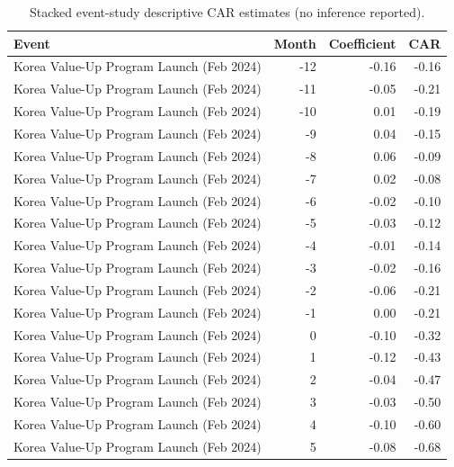 \begin{table}
\caption{Stacked event-study descriptive CAR estimates (no inference reported).}
\label{tab:event_study_coefs}
\begin{tabular}{lrrr}
\toprule
Event & Month & Coefficient & CAR \\
\midrule
Korea Value-Up Program Launch (Feb 2024) & -12 & -0.16 & -0.16 \\
Korea Value-Up Program Launch (Feb 2024) & -11 & -0.05 & -0.21 \\
Korea Value-Up Program Launch (Feb 2024) & -10 & 0.01 & -0.19 \\
Korea Value-Up Program Launch (Feb 2024) & -9 & 0.04 & -0.15 \\
Korea Value-Up Program Launch (Feb 2024) & -8 & 0.06 & -0.09 \\
Korea Value-Up Program Launch (Feb 2024) & -7 & 0.02 & -0.08 \\
Korea Value-Up Program Launch (Feb 2024) & -6 & -0.02 & -0.10 \\
Korea Value-Up Program Launch (Feb 2024) & -5 & -0.03 & -0.12 \\
Korea Value-Up Program Launch (Feb 2024) & -4 & -0.01 & -0.14 \\
Korea Value-Up Program Launch (Feb 2024) & -3 & -0.02 & -0.16 \\
Korea Value-Up Program Launch (Feb 2024) & -2 & -0.06 & -0.21 \\
Korea Value-Up Program Launch (Feb 2024) & -1 & 0.00 & -0.21 \\
Korea Value-Up Program Launch (Feb 2024) & 0 & -0.10 & -0.32 \\
Korea Value-Up Program Launch (Feb 2024) & 1 & -0.12 & -0.43 \\
Korea Value-Up Program Launch (Feb 2024) & 2 & -0.04 & -0.47 \\
Korea Value-Up Program Launch (Feb 2024) & 3 & -0.03 & -0.50 \\
Korea Value-Up Program Launch (Feb 2024) & 4 & -0.10 & -0.60 \\
Korea Value-Up Program Launch (Feb 2024) & 5 & -0.08 & -0.68 \\

\end{tabular}
\end{table}

